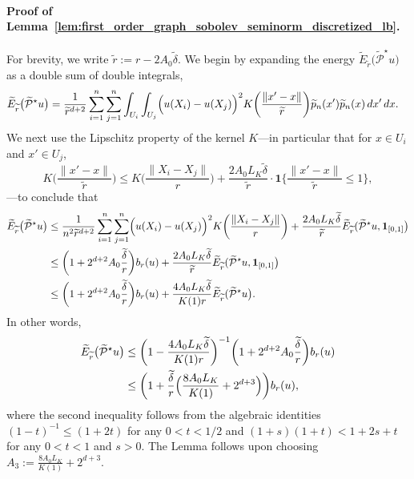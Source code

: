 \documentclass[twoside]{article}
\newcommand{\1}{\mathbf{1}}
\newcommand{\mc}[1]{\mathcal{#1}}
\newcommand{\wt}[1]{\widetilde{#1}}
\theoremstyle{definition}
\theoremstyle{remark}
\begin{document}
\paragraph{Proof of Lemma~\ref{lem:first_order_graph_sobolev_seminorm_discretized_lb}.}
For brevity, we write $\wt{r} := r - 2A_0\wt{\delta}$. We begin by expanding the energy $\wt{E}_{\wt{r}}\bigl(\wt{\mc{P}}^{\star}u\bigr)$ as a double sum of double integrals,
\begin{align*}
\wt{E}_{\wt{r}}\bigl(\wt{\mc{P}}^{\star}u\bigr) & = \frac{1}{\wt{r}^{d + 2}} \sum_{i = 1}^{n} \sum_{j = 1}^{n} \int_{U_i} \int_{U_j} \Bigl(u(X_i) - u(X_j)\Bigr)^2 K\biggl(\frac{\|x' - x\|}{\wt{r}}\biggr) \wt{p}_n(x') \wt{p}_n(x) \,dx' \,dx.
\end{align*}
We next use the Lipschitz property of the kernel $K$---in particular that for $x \in U_i$ and $x' \in U_j$,
\begin{equation*}
K\biggl(\frac{\|x' - x\|}{\wt{r}}\biggr) \leq K\biggl(\frac{\|X_i - X_j\|}{r}\biggr) + \frac{2A_0L_K\wt{\delta}}{\wt{r}} \cdot \1\biggl\{\frac{\|x' - x\|}{\wt{r}} \leq 1\biggr\},
\end{equation*}
---to conclude that
\begin{align}
\wt{E}_{\wt{r}}\bigl(\wt{\mc{P}}^{\star}u\bigr) & \leq \frac{1}{n^2\wt{r}^{d + 2}} \sum_{i = 1}^{n} \sum_{j = 1}^{n} \Bigl(u(X_i) - u(X_j)\Bigr)^2 K\biggl(\frac{\|X_i - X_j\|}{r}\biggr) + \frac{2A_0L_K\wt{\delta}}{\wt{r}}\wt{E}_{\wt{r}}(\wt{\mc{P}}^{\star}u,\1_{[0,1]}\bigr) \nonumber \\
& \leq \biggl(1 + 2^{d + 2}A_0\frac{\wt{\delta}}{r}\biggr) b_r(u) + \frac{2A_0L_K\wt{\delta}}{\wt{r}}\wt{E}_{\wt{r}}(\wt{\mc{P}}^{\star}u,\1_{[0,1]}\bigr) \nonumber \\
& \leq \biggl(1 + 2^{d + 2}A_0\frac{\wt{\delta}}{r}\biggr) b_r(u) + \frac{4A_0L_K\wt{\delta}}{K(1)r} \wt{E}_{\wt{r}}(\wt{\mc{P}}^{\star}u\bigr). \nonumber 
\end{align}
In other words,
\begin{align*}
\wt{E}_{\wt{r}}\bigl(\wt{\mc{P}}^{\star}u\bigr) & \leq \biggl(1 - \frac{4A_0L_K\wt{\delta}}{K(1)r}\biggr)^{-1}\biggl(1 + 2^{d + 2}A_0\frac{\wt{\delta}}{r}\biggr) b_r(u) \\
& \leq \biggl(1 + \frac{\wt{\delta}}{r}\Bigl(\frac{8A_0L_K}{K(1)} + 2^{d + 3}\Bigr)\biggr) b_r(u),
\end{align*}
where the second inequality follows from the algebraic identities $(1 - t)^{-1} \leq (1 + 2t)$ for any $0 < t < 1/2$ and $(1 + s)(1 + t) < 1 + 2s + t$ for any $0 < t < 1$ and $s > 0$. The Lemma follows upon choosing $A_3 := \frac{8A_0L_K}{K(1)} + 2^{d + 3}$. 
\end{document}
